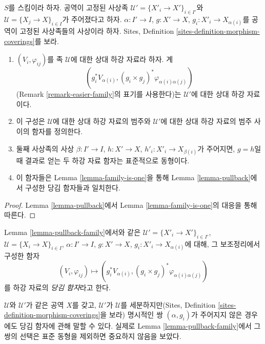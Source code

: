 \begin{lemma}
\label{lemma-pullback-family}
$S$를 스킴이라 하자. 공역이 고정된 사상족
$\mathcal{U}'=\{X'_i\to X'\}_{i\in I'}$와
$\mathcal{U}=\{X_j\to X\}_{i\in I}$가 주어졌다고 하자.
$\alpha:I'\to I$, $g:X'\to X$, $g_i:X'_i\to X_{\alpha(i)}$를 공역이
고정된 사상족들의 사상이라 하자. Sites, Definition
\ref{sites-definition-morphism-coverings}를 보라.
\begin{enumerate}
\item $(V_i,\varphi_{ij})$를 족 $\mathcal{U}$에 대한 상대 하강 자료라
하자. 계
$$
\left(
g_i^*V_{\alpha(i)}, (g_i \times g_j)^*\varphi_{\alpha(i) \alpha(j)}
\right)
$$
(Remark \ref{remark-easier-family}의 표기를 사용한다)는 $\mathcal{U}'$에
대한 상대 하강 자료이다.
\item 이 구성은 $\mathcal{U}$에 대한 상대 하강 자료의 범주와
$\mathcal{U}'$에 대한 상대 하강 자료의 범주 사이의 함자를 정의한다.
\item 둘째 사상족의 사상 $\beta:I'\to I$, $h:X'\to X$,
$h'_i:X'_i\to X_{\beta(i)}$가 주어지면, $g=h$일 때 결과로 얻는 두 하강
자료 함자는 표준적으로 동형이다.
\item 이 함자들은 Lemma \ref{lemma-family-is-one}을 통해 Lemma
\ref{lemma-pullback}에서 구성한 당김 함자들과 일치한다.
\end{enumerate}
\end{lemma}

\begin{proof}
Lemma \ref{lemma-pullback}에서 Lemma \ref{lemma-family-is-one}의 대응을
통해 따른다.
\end{proof}

\begin{definition}
\label{definition-pullback-functor-family}
Lemma \ref{lemma-pullback-family}에서와 같은
$\mathcal{U}'=\{X'_i\to X'\}_{i\in I'}$,
$\mathcal{U}=\{X_i\to X\}_{i\in I}$, $\alpha:I'\to I$,
$g:X'\to X$, $g_i:X'_i\to X_{\alpha(i)}$에 대해, 그 보조정리에서 구성한
함자
$$
(V_i, \varphi_{ij}) \longmapsto
(g_i^*V_{\alpha(i)}, (g_i \times g_j)^*\varphi_{\alpha(i) \alpha(j)})
$$
를 하강 자료의 {\it 당김 함자}라고 한다.
\end{definition}

\noindent
$\mathcal{U}$와 $\mathcal{U}'$가 같은 공역 $X$를 갖고,
$\mathcal{U}'$가 $\mathcal{U}$를 세분하지만(Sites, Definition
\ref{sites-definition-morphism-coverings}을 보라) 명시적인 쌍
$(\alpha,g_i)$가 주어지지 않은 경우에도 당김 함자에 관해 말할 수 있다.
실제로 Lemma \ref{lemma-pullback-family}에서 그 쌍의 선택은 표준 동형을
제외하면 중요하지 않음을 보았다.

